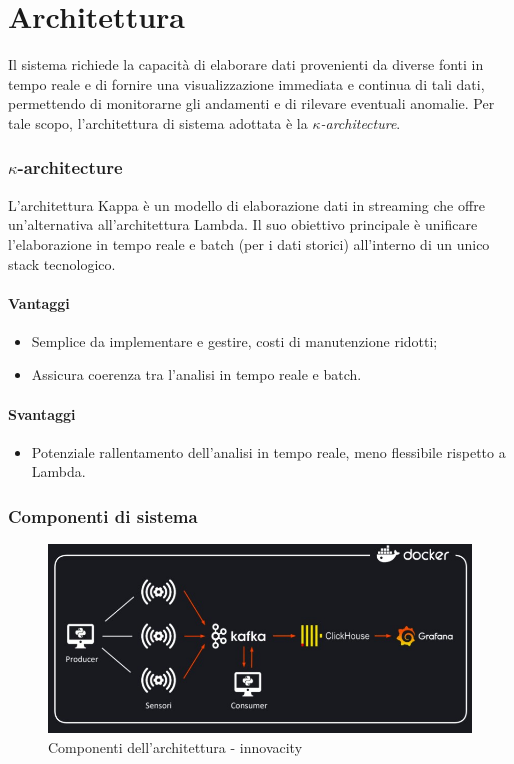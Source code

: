 \section{Architettura}

Il sistema richiede la capacità di elaborare dati provenienti da diverse fonti in tempo reale e di fornire una visualizzazione immediata e continua di tali dati, permettendo di monitorarne gli andamenti e di rilevare eventuali anomalie. 
Per tale scopo, l'architettura di sistema adottata è la \textit{$\kappa$-architecture}.

\subsubsection{$\kappa$-architecture}
L'architettura Kappa è un modello di elaborazione dati in streaming che offre un'alternativa all'architettura Lambda. Il suo obiettivo principale è unificare l'elaborazione in tempo reale e batch (per i dati storici) all'interno di un unico stack tecnologico.
\paragraph{Vantaggi}
\begin{itemize}
    \item Semplice da implementare e gestire, costi di manutenzione ridotti;
    \item Assicura coerenza tra l'analisi in tempo reale e batch.
\end{itemize}
\paragraph*{Svantaggi}
\begin{itemize}
    \item Potenziale rallentamento dell'analisi in tempo reale, meno flessibile rispetto a Lambda.
\end{itemize}

\subsubsection{Componenti di sistema}
\begin{figure}[H]
    \centering
    \includegraphics[width=1\textwidth]{../Images/SpecificaTecnica/architettura.jpg}
    \caption{Componenti dell'architettura - innovacity}
    \label{fig: fdf}
\end{figure}

